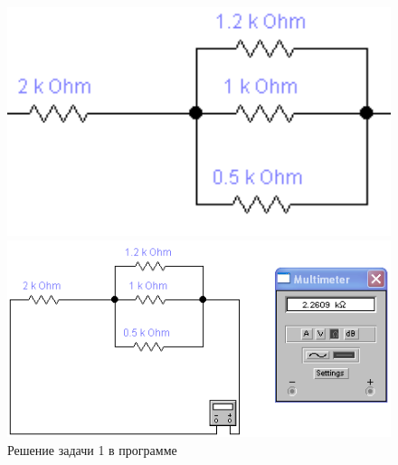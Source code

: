 \begin{figure}[H]
\begin{changemargin}{-1.5cm}{-2cm}
  \begin{center}
    \begin{minipage}[h]{0.4\linewidth}
        \includegraphics[width=1\textwidth]{authors/stepanuk-2-fig-1.png}
        \caption{Схема к задаче 1}
        \label{fig:stepanuk-2-fig-1}
    \end{minipage}
\hfill
    \begin{minipage}[h]{0.5\linewidth}
        \includegraphics[width=1\textwidth]{authors/stepanuk-2-fig-2.png}
        \caption{Решение задачи 1 в программе}
        \label{fig:stepanuk-2-fig-2}
    \end{minipage}


  \end{center}
\end{changemargin}

\end{figure}
